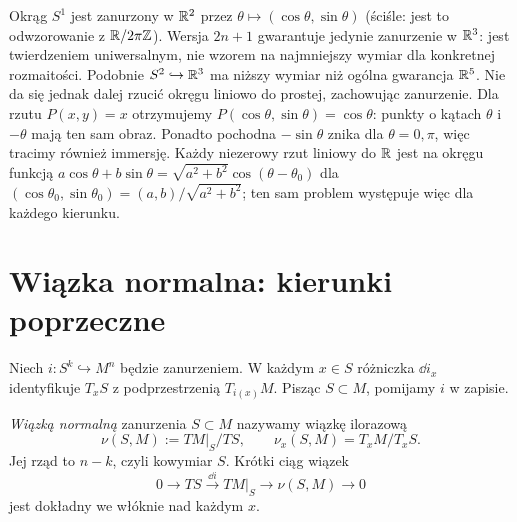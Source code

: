 \begin{przyklad}
Okrąg $S^1$ jest zanurzony w $\mathbb{R}^2$ przez
$\theta\mapsto(\cos\theta,\sin\theta)$
(ściśle: jest to odwzorowanie z $\mathbb{R}/2\pi\mathbb{Z}$).
Wersja $2n+1$ gwarantuje jedynie
zanurzenie w $\mathbb{R}^3$: jest twierdzeniem
uniwersalnym, nie wzorem na najmniejszy
wymiar dla konkretnej rozmaitości.
Podobnie $S^2\hookrightarrow\mathbb{R}^3$ ma
niższy wymiar niż ogólna gwarancja $\mathbb{R}^5$.
Nie da się jednak dalej rzucić okręgu liniowo do prostej,
zachowując zanurzenie. Dla rzutu $P(x,y)=x$
otrzymujemy $P(\cos\theta,\sin\theta)=\cos\theta$:
punkty o kątach $\theta$ i $-\theta$ mają ten sam obraz.
Ponadto pochodna $-\sin\theta$ znika dla $\theta=0,\pi$,
więc tracimy również immersję.
Każdy niezerowy rzut liniowy do $\mathbb{R}$ jest na okręgu
funkcją $a\cos\theta+b\sin\theta
=\sqrt{a^2+b^2}\cos(\theta-\theta_0)$
dla $(\cos\theta_0,\sin\theta_0)=(a,b)/\sqrt{a^2+b^2}$;
ten sam problem występuje więc dla każdego kierunku.

\begin{center}
\end{center}
\end{przyklad}

\section{Wiązka normalna: kierunki poprzeczne}
\label{sec:wiazka-normalna}

Niech $i:S^k\hookrightarrow M^n$ będzie
zanurzeniem. W każdym $x\in S$ różniczka
$\dd i_x$ identyfikuje $T_xS$ z
podprzestrzenią $T_{i(x)}M$.
Pisząc $S\subset M$, pomijamy $i$ w zapisie.

\begin{definicja}
\label{def:wiazka-normalna-15}
\emph{Wiązką normalną} zanurzenia $S\subset M$
nazywamy wiązkę ilorazową
\[
 \nu(S,M):=TM|_S/TS,\qquad
 \nu_x(S,M)=T_xM/T_xS.
\]
Jej rząd to $n-k$, czyli kowymiar $S$.
Krótki ciąg wiązek
\begin{equation}\label{eq:normalny-ciag}
 0\longrightarrow TS
 \stackrel{\dd i}{\longrightarrow}TM|_S
 \longrightarrow\nu(S,M)\longrightarrow0
\end{equation}
jest dokładny we włóknie nad każdym $x$.
\end{definicja}

